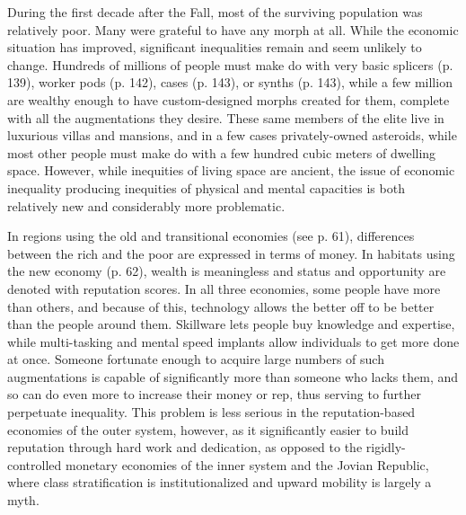 During the first decade after the Fall, most of the surviving population was relatively poor. Many were grateful to have any morph at all. While the economic situation has improved, significant inequalities remain and seem unlikely to change. Hundreds of millions of people must make do with very basic splicers (p. 139), worker pods (p. 142), cases (p. 143), or synths (p. 143), while a few million are wealthy enough to have custom-designed morphs created for them, complete with all the augmentations they desire. These same members of the elite live in luxurious villas and mansions, and in a few cases privately-owned asteroids, while most other people must make do with a few hundred cubic meters of dwelling space. However, while inequities of living space are ancient, the issue of economic inequality producing inequities of physical and mental capacities is both relatively new and considerably more problematic. 

In regions using the old and transitional economies (see p. 61), differences between the rich and the poor are expressed in terms of money. In habitats using the new economy (p. 62), wealth is meaningless and status and opportunity are denoted with reputation scores. In all three economies, some people have more than others, and because of this, technology allows the better off to be better than the people around them. Skillware lets people buy knowledge and expertise, while multi-tasking and mental speed implants allow individuals to get more done at once. Someone fortunate enough to acquire large numbers of such augmentations is capable of significantly more than someone who lacks them, and so can do even more to increase their money or rep, thus serving to further perpetuate inequality. This problem is less serious in the reputation-based economies of the outer system, however, as it significantly easier to build reputation through hard work and dedication, as opposed to the rigidly-controlled monetary economies of the inner system and the Jovian Republic, where class stratification is institutionalized and upward mobility is largely a myth. 

